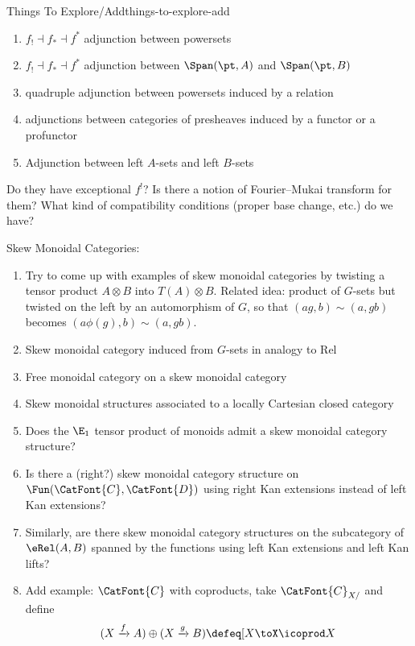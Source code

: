\begin{remark}{Things To Explore/Add}{things-to-explore-add}
\begin{enumerate}
\begin{enumerate}
                \item $f_{!}\dashv f_{*}\dashv f^{*}$ adjunction between powersets
                \item $f_{!}\dashv f_{*}\dashv f^{*}$ adjunction between $\Span(\pt,A)$ and $\Span(\pt,B)$
                \item quadruple adjunction between powersets induced by a relation
                \item adjunctions between categories of presheaves induced by a functor or a profunctor
                \item Adjunction between left $A$-sets and left $B$-sets
            \end{enumerate}
            Do they have exceptional $f^{!}$? Is there a notion of Fourier--Mukai transform for them? What kind of compatibility conditions (proper base change, etc.) do we have?
    \end{enumerate}
    Skew Monoidal Categories:
    \begin{enumerate}
        \item Try to come up with examples of skew monoidal categories by twisting a tensor product $A\otimes B$ into $T(A)\otimes B$. Related idea: product of $G$-sets but twisted on the left by an automorphism of $G$, so that $(ag,b)\sim(a,gb)$ becomes $(a\phi(g),b)\sim(a,gb)$.
        \item Skew monoidal category induced from $G$-sets in analogy to Rel
        \item Free monoidal category on a skew monoidal category
        \item Skew monoidal structures associated to a locally Cartesian closed category
        \item Does the $\E_{1}$ tensor product of monoids admit a skew monoidal category structure?
        \item Is there a (right?) skew monoidal category structure on $\Fun(\CatFont{C},\CatFont{D})$ using right Kan extensions instead of left Kan extensions?
        \item Similarly, are there skew monoidal category structures on the subcategory of $\eRel(A,B)$ spanned by the functions using left Kan extensions and left Kan lifts?
        \item Add example: $\CatFont{C}$ with coproducts, take $\CatFont{C}_{X/}$ and define
            \[
                (X\xrightarrow{f}A)\oplus(X\xrightarrow{g}B)%
                \defeq%
                [%
                    X%
                    \to%
                    X\icoprod X%
\]
\end{enumerate}
\end{remark}
